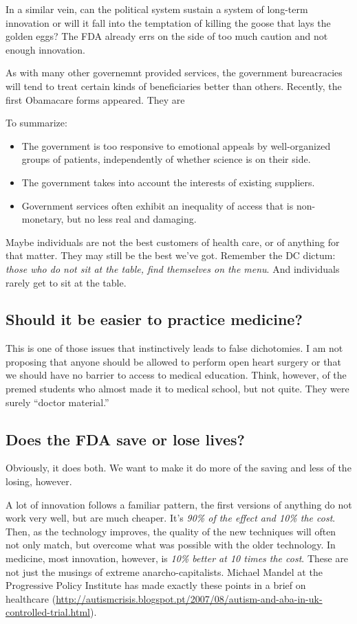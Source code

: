 In a similar vein, can the political system sustain a system of long-term
innovation or will it fall into the temptation of killing the goose that lays
the golden eggs? The FDA already errs on the side of too much caution and not
enough innovation.

As with many other governemnt provided services, the government bureacracies
will tend to treat certain kinds of beneficiaries better than others.
Recently, the first Obamacare forms appeared. They are 

To summarize:
\begin{itemize}
\item The government is too responsive to emotional appeals by well-organized
groups of patients, independently of whether science is on their side.
\item The government takes into account the interests of existing suppliers.
\item Government services often exhibit an inequality of access that is
non-monetary, but no less real and damaging.
\end{itemize}

Maybe individuals are not the best customers of health care, or of anything for
that matter. They may still be the best we've got. Remember the DC dictum:
\emph{those who do not sit at the table, find themselves on the menu}. And
individuals rarely get to sit at the table.

\subsection{Should it be easier to practice medicine?}

This is one of those issues that instinctively leads to false dichotomies. I am
not proposing that anyone should be allowed to perform open heart surgery or
that we should have no barrier to access to medical education. Think, however,
of the premed students who almost made it to medical school, but not quite.
They were surely ``doctor material.''

\subsection{Does the FDA save or lose lives?}

Obviously, it does both. We want to make it do more of the saving and less of
the losing, however.

A lot of innovation follows a familiar pattern, the first versions of anything
do not work very well, but are much cheaper. It's \emph{90\% of the effect and
10\% the cost}. Then, as the technology improves, the quality of the new
techniques will often not only match, but overcome what was possible with the
older technology. In medicine, most innovation, however, is \emph{10\% better
at 10 times the cost}. These are not just the musings of extreme
anarcho-capitalists. Michael Mandel at the Progressive Policy Institute has
made exactly these points in a brief on healthcare
(\url{http://autismcrisis.blogspot.pt/2007/08/autism-and-aba-in-uk-controlled-trial.html}).

